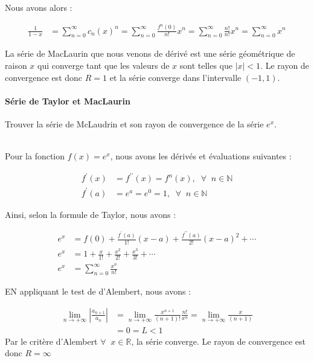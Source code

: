 \documentclass{report}
\begin{document}
\begin{multicols*}{2}
      Nous avons alors :

      \begin{align*}
        \frac{1}{1 - x} &= \sum_{n=0}^{\infty }c_n(x)^n 
                         = \sum_{n=0}^{\infty }\frac{f^{n}(0)}{n!}x^n 
                         = \sum_{n=0}^{\infty }\frac{n!}{n!}x^n 
                         = \sum_{n=0}^{\infty }x^n 
      \end{align*}  

      La série de MacLaurin que nous venons de dérivé est une 
      série géométrique de raison $x$ qui converge 
      tant que les valeurs de $x$ sont telles que 
      $|x| < 1$. Le rayon de convergence est donc $R = 1$ et 
      la série converge dans l'intervalle $(-1, 1)$.

      \paragraph{Série de Taylor et MacLaurin}
      Trouver la série de McLaudrin et son rayon de convergence 
      de la série $e^x$. 

      \mbox{}\\ 
      Pour la fonction $f(x) = e^x$, nous avons les dérivés et 
      évaluations suivantes : 

      \begin{align*}
        f^{\prime}(x) &=  f^{\prime\prime}(x) = f^{n}(x), \;\; 
            \forall \;\; n \in \mathbb{N} \\
        f^{\prime}(a) &= e^{a} = e^{0} = 1, 
            \;\;\forall \;\; n \in \mathbb{N}
      \end{align*}

      Ainsi, selon la formule de Taylor, nous avons  : 

      \begin{align*}
        e^{x} &= f(0) + \frac{f^{\prime}(a)}{1!}(x - a) 
                   + \frac{f^{\prime\prime}(a)}{2!}(x - a)^2  + \cdots \\  
        e^x &= 1    + \frac{x}{1!} + \frac{x^2}{2!} 
                   + \frac{x^3}{3!} +\cdots  \\  
        e^x &= \sum_{n=0}^{\infty }\frac{x^n}{n!} 
      \end{align*}  

      EN appliquant le test de d'Alembert, nous avons : 

      \begin{align*}
        \lim\limits_{n\to+\infty }\left| \frac{a_{n+1}}{a_n}  \right| &= 
              \lim\limits_{n \to+\infty } 
              \frac{x^{n+1}}{(n+1)!} \frac{n!}{x^n}  
         = 
        \lim\limits_{n \to+\infty } \frac{x}{(n+1)} \\
        &= 0 = L < 1 
      \end{align*} 
      Par le critère d'Alembert $\forall \;\; x \in \mathbb{R}$, la série 
      converge. Le rayon de convergence est donc $R = \infty$



\end{multicols*}
\end{document}
